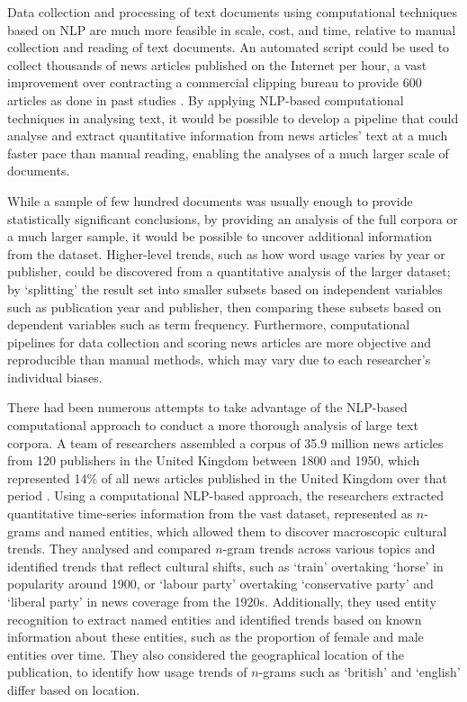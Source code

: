 \documentclass{report}
\begin{document}
Data collection and processing of text documents using computational techniques based on NLP are much more feasible in scale, cost, and time, relative to manual collection and reading of text documents. 
An automated script could be used to collect thousands of news articles published on the Internet per hour, a vast improvement over contracting a commercial clipping bureau to provide 600 articles as done in past studies \cite{coverdale2002depictions}.
By applying NLP-based computational techniques in analysing text, it would be possible to develop a pipeline that could analyse and extract quantitative information from news articles' text at a much faster pace than manual reading, enabling the analyses of a much larger scale of documents.

While a sample of few hundred documents was usually enough to provide statistically significant conclusions, by providing an analysis of the full corpora or a much larger sample, it would be possible to uncover additional information from the dataset.
Higher-level trends, such as how word usage varies by year or publisher, could be discovered from a quantitative analysis of the larger dataset; by `splitting' the result set into smaller subsets based on independent variables such as publication year and publisher, then comparing these subsets based on dependent variables such as term frequency.
Furthermore, computational pipelines for data collection and scoring news articles are more objective and reproducible than manual methods, which may vary due to each researcher's individual biases.

There had been numerous attempts to take advantage of the NLP-based computational approach to conduct a more thorough analysis of large text corpora. 
A team of researchers assembled a corpus of 35.9 million news articles from 120 publishers in the United Kingdom between 1800 and 1950, which represented 14\% of all news articles published in the United Kingdom over that period \cite{lansdall2017content}.
Using a computational NLP-based approach, the researchers extracted quantitative time-series information from the vast dataset, represented as $n$-grams and named entities, which allowed them to discover macroscopic cultural trends. 
They analysed and compared $n$-gram trends across various topics and identified trends that reflect cultural shifts, such as `train' overtaking `horse' in popularity around 1900, or `labour party' overtaking `conservative party' and `liberal party' in news coverage from the 1920s.
Additionally, they used entity recognition to extract named entities and identified trends based on known information about these entities, such as the proportion of female and male entities over time.
They also considered the geographical location of the publication, to identify how usage trends of $n$-grams such as `british' and `english' differ based on location.
\end{document}
